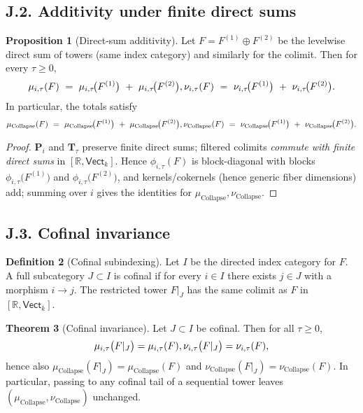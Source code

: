 \documentclass[11pt]{article}
\numberwithin{equation}{section}
\theoremstyle{plain}
\theoremstyle{definition}
\theoremstyle{remark}
\theoremstyle{plain}
\theoremstyle{definition}
\numberwithin{equation}{section}
\newtheorem{theorem}{Theorem}[section]
\newtheorem{proposition}[theorem]{Proposition}
\theoremstyle{definition}
\newtheorem{definition}[theorem]{Definition}
\DeclareRobustCommand{\muc}{\mu_{\mathrm{Collapse}}}
\DeclareRobustCommand{\nuc}{\nu_{\mathrm{Collapse}}}
\numberwithin{equation}{section}
\theoremstyle{plain}
\theoremstyle{definition}
\theoremstyle{remark}
\providecommand{\muc}{\mu_{\mathrm{Collapse}}}
\providecommand{\nuc}{\nu_{\mathrm{Collapse}}}
\providecommand{\n}{\unskip\space}
\begin{document}
\subsection*{J.2. Additivity under finite direct sums}

\begin{proposition}[Direct-sum additivity]\label{J:prop:sum}
Let \(F=F^{(1)}\oplus F^{(2)}\) be the levelwise direct sum of towers (same index category) and similarly for the colimit.
Then for every \(\tau\ge 0\),
\[
\mu_{i,\tau}(F)\ =\ \mu_{i,\tau}\!\big(F^{(1)}\big)\ +\ \mu_{i,\tau}\!\big(F^{(2)}\big),\qquad\n\nu_{i,\tau}(F)\ =\ \nu_{i,\tau}\!\big(F^{(1)}\big)\ +\ \nu_{i,\tau}\!\big(F^{(2)}\big).
\]
In particular, the totals satisfy
\[
\muc(F)\ =\ \muc\!\big(F^{(1)}\big)\ +\ \muc\!\big(F^{(2)}\big),\qquad\n\nuc(F)\ =\ \nuc\!\big(F^{(1)}\big)\ +\ \nuc\!\big(F^{(2)}\big).
\]
\end{proposition}

\begin{proof}
\(\mathbf{P}_i\) and \(\mathbf{T}_\tau\) preserve finite direct sums; filtered colimits \emph{commute with finite direct sums} in \([\mathbb{R},\mathsf{Vect}_k]\).
Hence \(\phi_{i,\tau}(F)\) is block-diagonal with blocks \(\phi_{i,\tau}\!\big(F^{(1)}\big)\) and \(\phi_{i,\tau}\!\big(F^{(2)}\big)\), and kernels/cokernels (hence generic fiber dimensions) add; summing over \(i\) gives the identities for \(\muc,\nuc\).
\end{proof}

\subsection*{J.3. Cofinal invariance}

\begin{definition}[Cofinal subindexing]
Let \(I\) be the directed index category for \(F\).
A full subcategory \(J\subset I\) is cofinal if for every \(i\in I\) there exists \(j\in J\) with a morphism \(i\to j\).
The restricted tower \(F|_J\) has the same colimit as \(F\) in \([\mathbb{R},\mathsf{Vect}_k]\).
\end{definition}

\begin{theorem}[Cofinal invariance]\label{J:thm:cofinal}
Let \(J\subset I\) be cofinal. Then for all \(\tau\ge 0\),
\[
\mu_{i,\tau}\big(F|_J\big)=\mu_{i,\tau}(F),\qquad\n\nu_{i,\tau}\big(F|_J\big)=\nu_{i,\tau}(F),
\]
hence also \(\muc(F|_J)=\muc(F)\) and \(\nuc(F|_J)=\nuc(F)\).
In particular, passing to any cofinal tail of a sequential tower leaves \((\muc,\nuc)\) unchanged.
\end{theorem}
\end{document}
